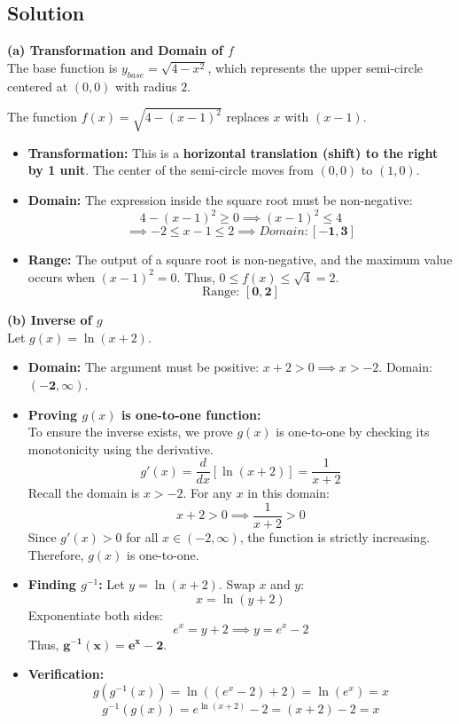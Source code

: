 \subsection*{Solution}

\textbf{(a) Transformation and Domain of $f$} \\
    The base function is $y_{base} = \sqrt{4-x^2}$, which represents the upper semi-circle centered at $(0,0)$ with radius $2$.
    
    The function $f(x) = \sqrt{4-(x-1)^2}$ replaces $x$ with $(x-1)$.
    \begin{itemize}
        \item \textbf{Transformation:} This is a \textbf{horizontal translation (shift) to the right by 1 unit}. The center of the semi-circle moves from $(0,0)$ to $(1,0)$.
        \item \textbf{Domain:} The expression inside the square root must be non-negative:
        \[ 4 - (x-1)^2 \geq 0 \implies (x-1)^2 \leq 4 \]
        \[ \implies -2 \leq x-1 \leq 2 \implies Domain:\mathbf{[-1, 3]} \]
        \item \textbf{Range:} The output of a square root is non-negative, and the maximum value occurs when $(x-1)^2=0$. Thus, $0 \leq f(x) \leq \sqrt{4} = 2$.
        \[ \text{Range: } \mathbf{[0, 2]} \]
    \end{itemize}

\textbf{(b) Inverse of $g$} \\
    Let $g(x) = \ln(x+2)$.
    \begin{itemize}
        \item \textbf{Domain:} The argument must be positive: $x+2 > 0 \implies x > -2$. Domain: $\mathbf{(-2, \infty)}$.
        \item \textbf{Proving $g(x)$ is one-to-one function:} \\
        To ensure the inverse exists, we prove $g(x)$ is one-to-one by checking its monotonicity using the derivative.
        \[ g'(x) = \frac{d}{dx}[\ln(x+2)] = \frac{1}{x+2} \]
        Recall the domain is $x > -2$. For any $x$ in this domain:
        \[ x+2 > 0 \implies \frac{1}{x+2} > 0 \]
        Since $g'(x) > 0$ for all $x \in (-2, \infty)$, the function is strictly increasing. Therefore, $g(x)$ is one-to-one.
        \item \textbf{Finding $g^{-1}$:} Let $y = \ln(x+2)$. Swap $x$ and $y$:
        \[ x = \ln(y+2) \]
        Exponentiate both sides:
        \[ e^x = y+2 \implies y = e^x - 2 \]
        Thus, $\mathbf{g^{-1}(x) = e^x - 2}$.
        \item \textbf{Verification:}
        \[ g(g^{-1}(x)) = \ln((e^x - 2) + 2) = \ln(e^x) = x \]
        \[ g^{-1}(g(x)) = e^{\ln(x+2)} - 2 = (x+2) - 2 = x \]
    \end{itemize}

